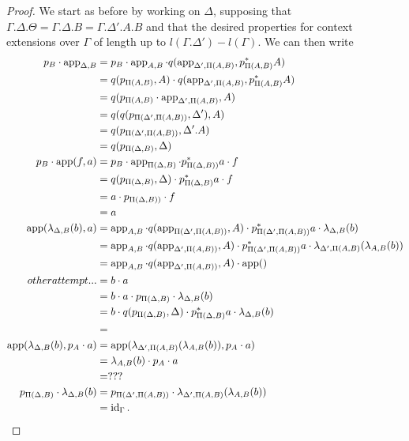 \documentclass[a4paper,fontsize=12pt]{scrartcl}
\begin{document}
\begin{proof}
  We start as before by working on $\Delta$, supposing that
  $\Gamma.\Delta.\Theta=\Gamma.\Delta.B=\Gamma.\Delta'.A.B$ and that
  the desired properties for context extensions over $\Gamma$ of length
  up to $l(\Gamma.\Delta')-l(\Gamma)$.
  We can then write
  \begin{align*}
    p_B\cdot\operatorname{app}_{\Delta,B}
    &=p_B\cdot
    \operatorname{app}_{A,B}\cdot
    q(\operatorname{app}_{\Delta',\Pi(A,B)},p^*_{\Pi(A,B)}A) \\
    &=q(p_{\Pi(A,B)},A)\cdot
    q(\operatorname{app}_{\Delta',\Pi(A,B)},p^*_{\Pi(A,B)}A) \\
    &=q(p_{\Pi(A,B)}\cdot\operatorname{app}_{\Delta',\Pi(A,B)},A) \\
    &=q(q(p_{\Pi(\Delta',\Pi(A,B))},\Delta'),A) \\
    &=q(p_{\Pi(\Delta',\Pi(A,B))},\Delta'.A) \\
    &=q(p_{\Pi(\Delta,B)},\Delta) \\
    p_B\cdot\operatorname{app}(f,a)
    &=p_B\cdot
    \operatorname{app}_{\Pi(\Delta,B)}\cdot
    p^*_{\Pi(\Delta,B))}a\cdot
    f \\
    &=q(p_{\Pi(\Delta,B)},\Delta)\cdot
    p^*_{\Pi(\Delta,B)}a\cdot
    f \\
    &=a\cdot
    p_{\Pi(\Delta,B))}\cdot
    f \\
    &=a \\
    \operatorname{app}(\lambda_{\Delta,B}(b),a)
    &=\operatorname{app}_{A,B}\cdot
    q(\operatorname{app}_{\Pi(\Delta',\Pi(A,B))},A)\cdot
    p^*_{\Pi(\Delta',\Pi(A,B))}a\cdot
    \lambda_{\Delta,B}(b) \\
    &=\operatorname{app}_{A,B}\cdot
    q(\operatorname{app}_{\Delta',\Pi(A,B))},A)\cdot
    p^*_{\Pi(\Delta',\Pi(A,B))}a\cdot
    \lambda_{\Delta',\Pi(A,B)}(\lambda_{A,B}(b)) \\
    &=\operatorname{app}_{A,B}\cdot
    q(\operatorname{app}_{\Delta',\Pi(A,B))},A)\cdot
    \operatorname{app}() \\
    other attempt...
    &=b\cdot a \\
    &=b\cdot
    a\cdot
    p_{\Pi(\Delta,B)}\cdot
    \lambda_{\Delta,B}(b) \\
    &=b\cdot
    q(p_{\Pi(\Delta,B)},\Delta)\cdot
    p^*_{\Pi(\Delta,B)}a\cdot
    \lambda_{\Delta,B}(b) \\
    &= \\
    \operatorname{app}(\lambda_{\Delta,B}(b),p_A\cdot a)
    &=\operatorname{app}(\lambda_{\Delta',\Pi(A,B)}(\lambda_{A,B}(b)),p_A\cdot a) \\
    &=\lambda_{A,B}(b)\cdot p_A\cdot a \\
    &= ??? \\
    p_{\Pi(\Delta,B)}\cdot\lambda_{\Delta,B}(b)
    &=p_{\Pi(\Delta',\Pi(A,B))}\cdot
    \lambda_{\Delta',\Pi(A,B)}(\lambda_{A,B}(b)) \\
    &=\operatorname{id}_\Gamma.
  \end{align*}


\end{proof}
\end{document}
